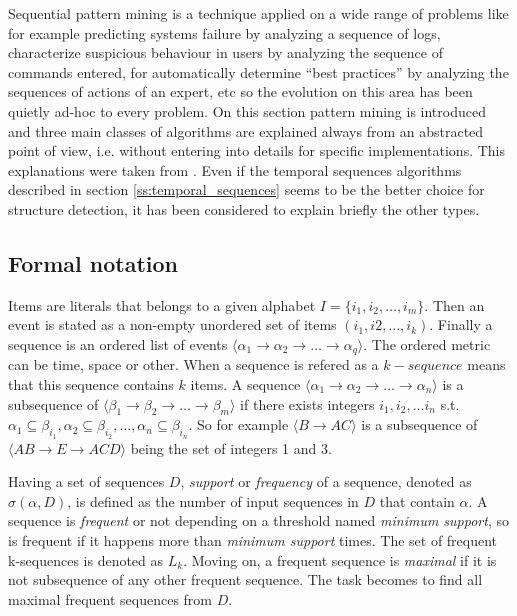 Sequential pattern mining is a technique applied on a wide range of problems
like for example predicting systems failure by analyzing a sequence of logs,
characterize suspicious behaviour in users by analyzing the sequence of commands
entered, for automatically determine “best practices” by analyzing the sequences
of actions of an expert, etc so the evolution on this area has been quietly
ad-hoc to every problem. On this section pattern mining is introduced and three
main classes of algorithms are explained always from an abstracted point of
view, i.e. without entering into details for specific implementations. This
explanations were taken from \cite{mooney2013sequential}. Even if the temporal
sequences algorithms described in section \ref{ss:temporal_sequences} seems to
be the better choice for structure detection, it has been considered to explain
briefly the other types.

\subsection{Formal notation}\label{ss:formal_notation}

Items are literals that belongs to a given alphabet $I=\{i_{1}, i_{2}, \dots,
i_{m}\}$. Then an event is stated as a non-empty unordered set of items
$(i_{1}, i{2}, \dots, i_{k})$. Finally a sequence is an ordered list of
events $\langle\alpha_{1} \rightarrow \alpha_{2} \rightarrow \dots \rightarrow
\alpha_{q}\rangle$. The ordered metric can be time, space or other. When a
sequence is refered as a $k-sequence$ means that this sequence contains $k$
items. A sequence $\langle\alpha_{1} \rightarrow \alpha_{2} \rightarrow \dots 
\rightarrow \alpha_{n}\rangle$ is a subsequence of $\langle\beta_{1} \rightarrow 
\beta_{2} \rightarrow \dots \rightarrow \beta_{m}\rangle$ if there exists
integers $i_{1}, i_{2}, \dots i_{n}$ s.t. $\alpha_{1} \subseteq \beta_{i_{1}}, 
\alpha_{2} \subseteq \beta_{i_{2}}, \dots, \alpha_{n} \subseteq \beta_{i_{n}}$.
So for example $\langle B \rightarrow AC\rangle$ is a subsequence of 
$\langle AB \rightarrow E \rightarrow ACD \rangle$ being the set of integers 1
and 3.

Having a set of sequences $D$, {\it support} or {\it frequency} of a sequence,
denoted as $\sigma(\alpha, D)$, is defined as the number of input sequences in $D$
that contain $\alpha$. A sequence is {\it frequent} or not depending on a
threshold named {\it minimum support}, so is frequent if it happens more than
{\it minimum support} times. The set of frequent k-sequences is denoted as
$L_{k}$. Moving on, a frequent sequence is {\it maximal} if it is not subsequence
of any other frequent sequence. The task becomes to find all maximal frequent
sequences from $D$.

